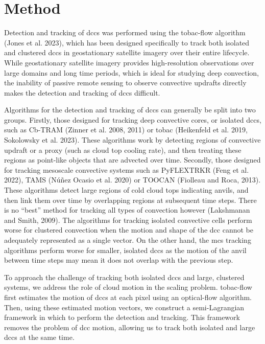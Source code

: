 \section{Method}

Detection and tracking of \acrshort{dcc}s was performed using the tobac-flow
algorithm (Jones et al. 2023), which has been designed specifically to
track both isolated and clustered \acrshort{dcc}s in geostationary satellite
imagery over their entire lifecycle. While geostationary satellite
imagery provides high-resolution observations over large domains and
long time periods, which is ideal for studying deep convection, the
inability of passive remote sensing to observe convective updrafts
directly makes the detection and tracking of \acrshort{dcc}s difficult.

Algorithms for the detection and tracking of \acrshort{dcc}s can generally be split
into two groups. Firstly, those designed for tracking deep convective
cores, or isolated \acrshort{dcc}s, such as Cb-TRAM (Zinner et al. 2008, 2011) or
tobac (Heikenfeld et al. 2019, Sokolowsky et al. 2023). These algorithms
work by detecting regions of convective updraft or a proxy (such as
cloud top cooling rate), and then treating these regions as point-like
objects that are advected over time. Secondly, those designed for
tracking mesoscale convective systems such as PyFLEXTRKR (Feng et al.
2022), TAMS (Núñez Ocasio et al. 2020) or TOOCAN (Fiolleau and Roca,
2013). These algorithms detect large regions of cold cloud tops
indicating anvils, and then link them over time by overlapping regions
at subsequent time steps. There is no ``best'' method for tracking all
types of convection however (Lakshmanan and Smith, 2009). The algorithms
for tracking isolated convective cells perform worse for clustered
convection when the motion and shape of the \acrshort{dcc} cannot be adequately
represented as a single vector. On the other hand, the \acrshort{mcs} tracking
algorithms perform worse for smaller, isolated \acrshort{dcc}s as the motion of the
anvil between time steps may mean it does not overlap with the previous
step.

To approach the challenge of tracking both isolated \acrshort{dcc}s and large,
clustered systems, we address the role of cloud motion in the scaling
problem. tobac-flow first estimates the motion of \acrshort{dcc}s at each pixel
using an optical-flow algorithm. Then, using these estimated motion
vectors, we construct a semi-Lagrangian framework in which to perform
the detection and tracking. This framework removes the problem of \acrshort{dcc}
motion, allowing us to track both isolated and large \acrshort{dcc}s at the same
time.

